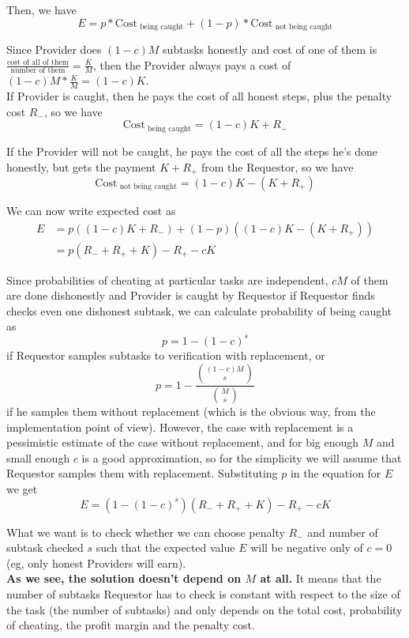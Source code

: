 \documentclass{winnower}
\begin{document}
Then, we have 
$$
E = p * \text{Cost}_{\text{ being caught}} + (1 - p) * \text{Cost}_{\text{ not being caught}}
$$

Since Provider does $(1-c) M$ subtasks honestly and cost of one of them is $\frac{\text{cost of all of them}}{\text{number of them}} = \frac{K}{M}$, then the Provider always pays a cost of $(1 - c) M * \frac{K}{M} = (1 - c) K$.\\

If Provider is caught, then he pays the cost of all honest steps, plus the penalty cost $R_{-}$, so we have 
$$\text{Cost}_{\text{ being caught}} = (1-c)K + R_{-}$$

If the Provider will not be caught, he pays the cost of all the steps he's done honestly, but gets the payment $K + R_{+}$ from the Requestor, so we have
$$\text{Cost}_{\text{ not being caught}} = (1-c)K - (K + R_{+})$$

We can now write expected cost as 
\begin{equation}
\begin{aligned}
E &= p((1-c)K + R_{-}) + (1-p)((1-c)K - (K + R_{+})) \\
  &= p(R_{-} + R_{+} + K) - R_{+} - cK
\end{aligned}
\end{equation}

Since probabilities of cheating at particular tasks are independent, $cM$ of them are done dishonestly and Provider is caught by Requestor if Requestor finds checks even one dishonest subtask, we can calculate probability of being caught as
$$p = 1 - (1-c)^s$$ if Requestor samples subtasks to verification with replacement, or 
$$p = 1 - \frac{{{(1-c)M}\choose{s}}}{{{M}\choose{s}}}$$ if he samples them without replacement (which is the obvious way, from the implementation point of view).
However, the case with replacement is a pessimistic estimate of the case without replacement, and for big enough $M$ and small enough $c$ is a good approximation, so for the simplicity we will assume that Requestor samples them with replacement.
Substituting $p$ in the equation for $E$ we get
$$E = (1-(1-c)^s)(R_{-} + R_{+} + K) - R_{+} - cK$$

What we want is to check whether we can choose penalty $R_{-}$ and number of subtask checked $s$ such that the expected value $E$ will be negative only of $c = 0$ (eg, only honest Providers will earn). \\
\textbf{As we see, the solution doesn't depend on $M$ at all.} It means that the number of subtasks Requestor has to check is constant with respect to the size of the task (the number of subtasks) and only depends on the total cost, probability of cheating, the profit margin and the penalty cost.
\end{document}
